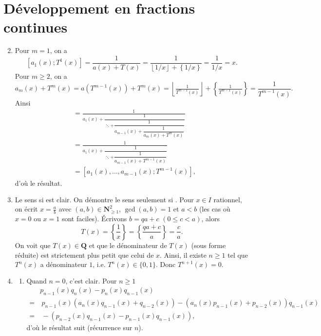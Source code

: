 \documentclass[french]{article}
\theoremstyle{definition}
\newcommand{\set}[1]{\left\{#1\right\}}
\newcommand{\floor}[1]{\left\lfloor#1\right\rfloor}
\newcommand{\Nbb}{\mathbf{N}}
\newcommand{\Qbb}{\mathbf{Q}}
\begin{document}
\section*{D\'eveloppement en fractions continues}
\begin{enumerate}
    \setcounter{enumi}{1}
    \item \label{Partie2} Pour $m = 1$, on a
        $$[a_1(x);T^1(x)] = \frac{1}{a(x) + T(x)} = \frac{1}{\floor{1/x} + \set{1/x}} = \frac{1}{1/x} = x.$$
    Pour $m \ge 2$, on a
        $$a_m(x) + T^m(x) = a(T^{m-1}(x)) + T^m(x) = \floor{\tfrac{1}{T^{m-1}(x)}} + \set{\tfrac{1}{T^{m-1}(x)}} = \frac{1}{T^{m-1}(x)}.$$
    Ainsi
        \begin{align*}
            [a_1(x),\ldots,a_m(x);T^m(x)] & = \frac{1}{a_1(x) + \dfrac{1}{\ddots + \dfrac{1}{a_{m-1}(x) + \dfrac{1}{a_m(x) + T^m(x)}}}} \\
            & = \frac{1}{a_1(x) + \dfrac{1}{\ddots + \dfrac{1}{a_{m-1}(x) + T^{m-1}(x)}}} \\
            & = [a_1(x),\ldots,a_{m-1}(x);T^{m-1}(x)],
        \end{align*}
    d'o\`u le r\'esultat.
    
    \item \label{Partie3} Le sens \og si \fg{} est clair. On d\'emontre le sens \og seulement si \fg{}. Pour $x \in I$ rationnel, on \'ecrit $x = \tfrac{a}{b}$ avec $(a,b) \in \Nbb_{\ge 1}^2$, $\gcd(a,b) = 1$ et $a < b$ (les cas o\`u $x = 0$ ou $x=1$ sont faciles). \'Ecrivons $b = qa + c$ $(0 \le c < a)$, alors 
        $$T(x) = \set{\frac{1}{x}} = \set{\frac{qa + c}{a}} = \frac{c}{a}.$$
    On voit que $T(x) \in \Qbb$ et que le d\'enominateur de $T(x)$ (sous forme r\'eduite) est strictement plus petit que celui de $x$. Ainsi, il existe $n \ge 1$ tel que $T^n(x)$ a d\'enominateur $1$, i.e. $T^n(x) \in \{0,1\}$. Donc $T^{n+1}(x) = 0$.
    
    \item \label{Partie4} 
    \begin{enumerate}
        \item \label{Partie4a}
             Quand $n = 0$, c'est clair.  Pour $n \ge 1$
                \begin{align*}
                    & p_{n-1}(x)q_n(x) - p_n(x)q_{n-1}(x) \\
                    = & \  p_{n-1}(x)(a_n(x) q_{n-1}(x) + q_{n-2}(x)) - (a_n(x) p_{n-1}(x) + p_{n-2}(x))q_{n-1}(x) \\
                    = & \  -(p_{n-2}(x)q_{n-1}(x) - p_{n-1}(x)q_{n-1}(x)),
                \end{align*}
            d'o\`u le r\'esultat suit (r\'ecurrence sur $n$).
            

\end{enumerate}
\end{enumerate}
\end{document}
